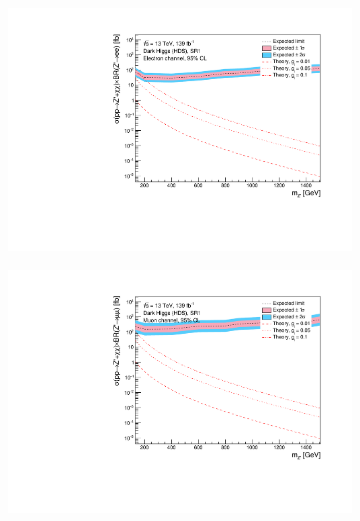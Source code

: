 \documentclass[12pt, a4paper]{book}
\begin{document}
\begin{figure}[!ht]
	\centering
	\begin{subfigure}[b]{0.49\textwidth}
      \centering
      \includegraphics[width=1\textwidth]{Limits/Model_independent/50-100/DH_HDS/mass_exclusion_ee.pdf}
   \end{subfigure}
   \hfill
   \begin{subfigure}[b]{0.49\textwidth}
      \centering
      \includegraphics[width=1\textwidth]{Limits/Model_independent/50-100/DH_HDS/mass_exclusion_uu.pdf}
   \end{subfigure}
   \hfill
   \begin{subfigure}[b]{0.49\textwidth}
      \centering

\end{subfigure}
\end{figure}
\end{document}
